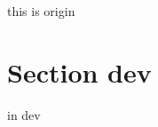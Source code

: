 \documentclass{article}
\begin{document}
    this is origin

    \section{Section dev}
    in dev
\end{document}
